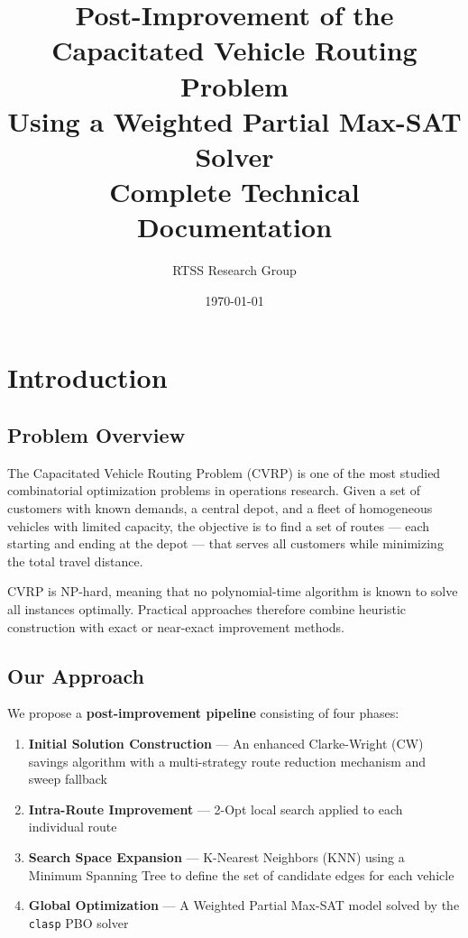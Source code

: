 \documentclass[12pt,a4paper]{article}
\title{\textbf{Post-Improvement of the Capacitated Vehicle Routing Problem\\Using a Weighted Partial Max-SAT Solver}\\[1em]
\large Complete Technical Documentation}
\author{RTSS Research Group}
\date{\today}
\theoremstyle{definition}
\begin{document}
\maketitle

\tableofcontents
\newpage

\section{Introduction}

\subsection{Problem Overview}

The Capacitated Vehicle Routing Problem (CVRP) is one of the most studied combinatorial optimization problems in operations research. Given a set of customers with known demands, a central depot, and a fleet of homogeneous vehicles with limited capacity, the objective is to find a set of routes --- each starting and ending at the depot --- that serves all customers while minimizing the total travel distance.

CVRP is NP-hard, meaning that no polynomial-time algorithm is known to solve all instances optimally. Practical approaches therefore combine heuristic construction with exact or near-exact improvement methods.

\subsection{Our Approach}

We propose a \textbf{post-improvement pipeline} consisting of four phases:

\begin{enumerate}[label=\textbf{Phase \arabic*:}]
    \item \textbf{Initial Solution Construction} --- An enhanced Clarke-Wright (CW) savings algorithm with a multi-strategy route reduction mechanism and sweep fallback
    \item \textbf{Intra-Route Improvement} --- 2-Opt local search applied to each individual route
    \item \textbf{Search Space Expansion} --- K-Nearest Neighbors (KNN) using a Minimum Spanning Tree to define the set of candidate edges for each vehicle
    \item \textbf{Global Optimization} --- A Weighted Partial Max-SAT model solved by the \texttt{clasp} PBO solver
\end{enumerate}
\end{document}
